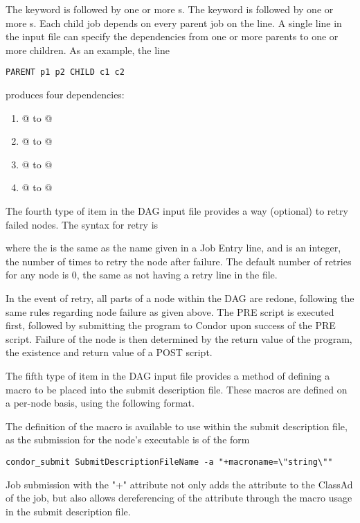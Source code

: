 The  keyword is followed by one or more
s.
The  keyword is followed by one or more
s.
Each child job depends on every parent job on the line.
A single line in the input file can specify the dependencies from one or more
parents to one or more children.
As an example, the line
\begin{verbatim}
PARENT p1 p2 CHILD c1 c2
\end{verbatim}
produces four dependencies:
\begin{enumerate}
\item{@ to @}
\item{@ to @}
\item{@ to @}
\item{@ to @}
\end{enumerate}

The fourth type of item in the DAG input file provides a
way (optional) to retry failed nodes.
The syntax for retry is

  

where the  is the same as the name given in
a Job Entry line, and  is an integer,
the number of times to retry the node after failure.
The default number of retries for any node is 0,
the same as not having a retry line in the file.

In the event of retry, all parts of a node within the DAG
are redone, following the same rules regarding node failure
as given above.
The PRE script is executed first,
followed by submitting the program to Condor upon success of
the PRE script.
Failure of the node is then determined by the return value of
the program, the existence and return value of a POST script.

The fifth type of item in the DAG input file provides a
method of defining a macro to be placed into the submit description
file.
These macros are defined on a per-node basis, using the
following format.

  

The definition of the macro is available to use within the
submit description file, as the submission for the node's
executable is of the form
\begin{verbatim}
condor_submit SubmitDescriptionFileName -a "+macroname=\"string\""
\end{verbatim}
Job submission with the "+" attribute not only adds the attribute
to the ClassAd of the job,
but also allows dereferencing of the attribute through the macro
usage in the submit description file.

